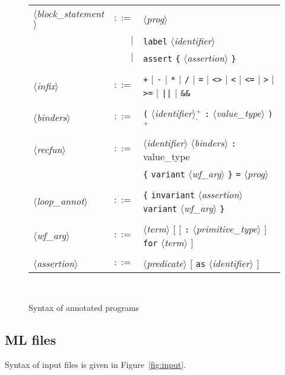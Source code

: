 \documentclass[a4paper,12pt]{report}
\newcommand{\te}[1]{\texttt{#1}}
\newcommand{\nt}[1]{$\langle$\textsl{#1}$\rangle$}
\newcommand{\plus}{$^+$}
\newcommand{\plussep}[1]{$^+_#1$}
\begin{document}
\begin{figure}[htbp]
\begin{center}
\begin{tabular}{lrl}
      \nt{block\_statement}
    & $::=$ & \nt{prog} \\
      & $|$ & \te{label} \nt{identifier} \\
      & $|$ & \te{assert} \te{\{} \nt{assertion} \te{\}} \\
  \\[0.1em]
 
  \nt{infix}
    & $::=$ & \te{+} $|$ \te{-} $|$ \te{*} $|$ \te{/} $|$ 
              \te{=} $|$ \te{<>} $|$ 
              \te{<} $|$ \te{<=} $|$ \te{>} $|$ \te{>=} $|$
              \te{||} $|$ \te{\&\&} \\
  \\[0.1em]

  \nt{binders}
    & $::=$ & \te{(} \nt{identifier}\plussep{\te{,}} \te{:}
              \nt{value\_type} \te{)}\plus \\
  \\[0.1em]

  \nt{recfun}
    & $::=$ & \nt{identifier} \nt{binders} \te{:}
              value\_type \\
      &     & \te{\{} \te{variant} \nt{wf\_arg} \te{\}}
              \te{=} \nt{prog} \\
  \\[0.1em]

  \nt{loop\_annot}
    & $::=$ & \te{\{} \te{invariant} \nt{assertion} 
              \te{variant} \nt{wf\_arg} \te{\}} \\
  \\[0.1em]

  \nt{wf\_arg} 
    & $::=$ & \nt{term} $[$ $[$ \te{:} \nt{primitive\_type} $]$
                            \te{for} \nt{term} $]$ \\
  \\[0.1em]

  \nt{assertion} 
    & $::=$ & \nt{predicate} $[$ \te{as} \nt{identifier} $]$ \\

\end{tabular}\\
\hrulefill
\caption{Syntax of annotated programs}
\label{fig:caml}
\end{center}
\end{figure}


\subsection{ML files}
\label{syntax:mlfiles}

Syntax of input files is given in Figure~\ref{fig:input}.
\end{document}
